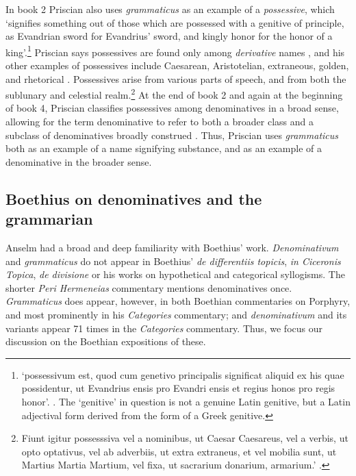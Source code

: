 \documentclass[]{article}
\begin{document}
In book 2 Priscian also uses \textit{grammaticus} as an example of a \textit{possessive}, which `signifies something out of those which are possessed with a genitive of principle, as Evandrian sword for Evandrius' sword, and kingly honor for the honor of a king'.\footnote{`possessivum est, quod cum genetivo principalis significat aliquid ex his quae possidentur, ut Evandrius ensis pro Evandri ensis et regius honos pro regis honor'. \cite[\textit{inst. gram.} II, p. 68]{inst.gram.}.  The `genitive' in question is not a genuine Latin genitive, but a Latin adjectival form derived from the form of a Greek genitive.} Priscian says possessives are found only among \textit{derivative} names \cite[\textit{inst. gram.} II, p. 60]{inst.gram.}, and his other examples of possessives include Caesarean, Aristotelian, extraneous, golden, and rhetorical \cite[\textit{inst. gram.} II, p. 69]{inst.gram.}. Possessives arise from various parts of speech, and from both the sublunary and celestial realm.\footnote{Fiunt igitur possesssiva vel a nominibus, ut Caesar Caesareus, vel a verbis, ut opto optativus, vel ab adverbiis, ut extra extraneus, et vel mobilia sunt, ut Martius Martia Martium, vel fixa, ut sacrarium donarium, armarium.' \cite[\textit{inst. gram.} II, p. 69]{inst.gram.}.} At the end of book 2 and again at the beginning of book 4, Priscian classifies possessives among denominatives in a broad sense, allowing for the term denominative to refer to both a broader class and a subclass of denominatives broadly construed \cite[\textit{inst. gram.} pp. 82, 117]{inst.gram.}. Thus, Priscian uses \textit{grammaticus} both as an example of a name signifying substance, and as an example of a denominative in the broader sense.
\subsection{Boethius on denominatives and the grammarian}
Anselm had a broad and deep familiarity with Boethius' work. \textit{Denominativum} and \textit{grammaticus} do not appear in Boethius' \textit{de differentiis topicis}, \textit{in Ciceronis Topica}, \textit{de divisione} or his works on hypothetical and categorical syllogisms. The shorter \textit{Peri Hermeneias} commentary mentions denominatives once. \textit{Grammaticus} does appear, however, in both Boethian commentaries on Porphyry, and most prominently in his \textit{Categories} commentary; and \textit{denominativum} and its variants appear 71 times in the \textit{Categories} commentary. Thus, we focus our discussion on the Boethian expositions of these.
\end{document}
